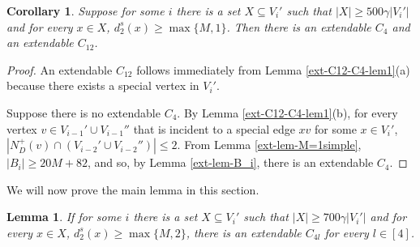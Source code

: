 \documentclass{article}
\newtheorem{cor}[theorem]{Corollary}
\newtheorem{lemma}[theorem]{Lemma}
\begin{document}
\begin{cor}\label{ext-cor-C4}
    Suppose for some $i$ there is a set $X\subseteq V_i'$ such that $|X|\geq 500\gamma  |V_i'|$ and for every $x\in X$, $d^s_2(x)\geq \max\{M,1\}$. Then there is an extendable $C_4$ and an extendable $C_{12}$.
\end{cor}
\begin{proof}
An extendable $C_{12}$ follows immediately from Lemma \ref{ext-C12-C4-lem1}(a) because there exists a special vertex in $V_{i}'$.

Suppose there is no extendable $C_4$. By Lemma \ref{ext-C12-C4-lem1}(b), for every vertex $v\in V_{i-1}'\cup V_{i-1}''$ that is incident to a special edge $xv$ for  some $x
\in V_{i}'$,  $|N^+_D(v)\cap (V_{i-2}'\cup V_{i-2}'')|\leq 2$. From Lemma \ref{ext-lem-M=1simple}, $|B_i|\geq 20M+82$, and so, by Lemma \ref{ext-lem-B_i}, there is an extendable $C_4.$
\end{proof}
We will now prove the main lemma in this section.

\begin{lemma}\label{ext-lem-M=1}
 If for some $i$ there is a set $X\subseteq V_i'$ such that $|X|\geq 700\gamma |V_i'|$ and for every $x\in X$, $d^s_2(x)\geq \max\{M,2\}$, there is an extendable $C_{4l}$ for every $l \in [4]$.
\end{lemma}
\end{document}
